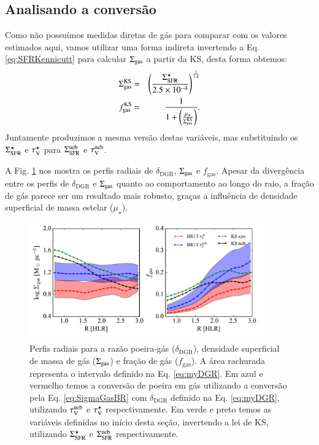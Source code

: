 \subsection{Analisando a conversão}
\label{sec:gasfrac:gas2dust:analisradperf}

Como não possuímos medidas diretas de gás para comparar com os valores estimados aqui, vamos
utilizar uma forma indireta invertendo a Eq. \ref{eq:SFRKennicutt} para calcular $\SigmaGas$ a
partir da KS, desta forma obtemos:
\begin{eqnarray}
	\Sigma_{\mathrm{gas}}^{\mathrm{KS}} &=& \left(\frac{\Sigma_{\mathrm{SFR}}^\star}{2.5 \times 10^{-4}}\right)^{\frac{1}{1.4}} \\
	\label{eq:SigmaGasKenn}
	f_{\mathrm{gas}}^{\mathrm{KS}} &=& \frac{1}{1 +
	\left(\frac{\mu_\star}{\Sigma_{\mathrm{gas}}^{\mathrm{KS}}}\right)}.
	\label{eq:fGasKenn}
\end{eqnarray}
\noindent Juntamente produzimos a mesma versão destas variáveis, mas substituindo os $\Sigma_{\mathrm{SFR}}^\star$
e $\tau_{\mathrm{V}}^\star$ para $\Sigma_{\mathrm{SFR}}^{\mathrm{neb}}$ e $\tau_{\mathrm{V}}^{\mathrm{neb}}$.

A Fig. \ref{fig:propsGasR} nos mostra os perfis radiais de $\delta_{\mathrm{DGR}}$, $\SigmaGas$ e
$f_{\mathrm{gas}}$. Apesar da divergência entre os perfis de $\delta_{\mathrm{DGR}}$ e $\SigmaGas$
quanto ao comportamento ao longo do raio, a fração de gás parece ser um resultado mais robusto,
graças a influência de densidade superficial de massa estelar ($\mu_\star$).
\begin{figure}
	\centering
	\includegraphics[width=0.9\textwidth]{figuras/gas_R.pdf}
	\caption[Perfis radiais de $\SigmaGas$ e $f_{\mathrm{gas}}$.]
	{Perfis radiais para a razão poeira-gás ($\delta_{\mathrm{DGR}}$), densidade superficial de massa
de gás ($\SigmaGas$) e fração de gás ($f_{\mathrm{gas}}$). A área rachurada representa o intervalo
definido na Eq. \ref{eq:myDGR}. Em azul e vermelho temos a conversão de poeira em gás utilizando a
conversão pela Eq. \ref{eq:SigmaGasBR} com $\delta_{\mathrm{DGR}}$ definido na Eq. \ref{eq:myDGR},
utilizando $\tau_{\mathrm{V}}^{\mathrm{neb}}$ e $\tau_{\mathrm{V}}^\star$ respectivamente. Em verde e preto temos as variáveis definidas no
início desta seção, invertendo a lei de KS, utilizando $\Sigma_{\mathrm{SFR}}^\star$ e $\Sigma_{\mathrm{SFR}}^{\mathrm{neb}}$ respectivamente.}
	\label{fig:propsGasR}
\end{figure}

